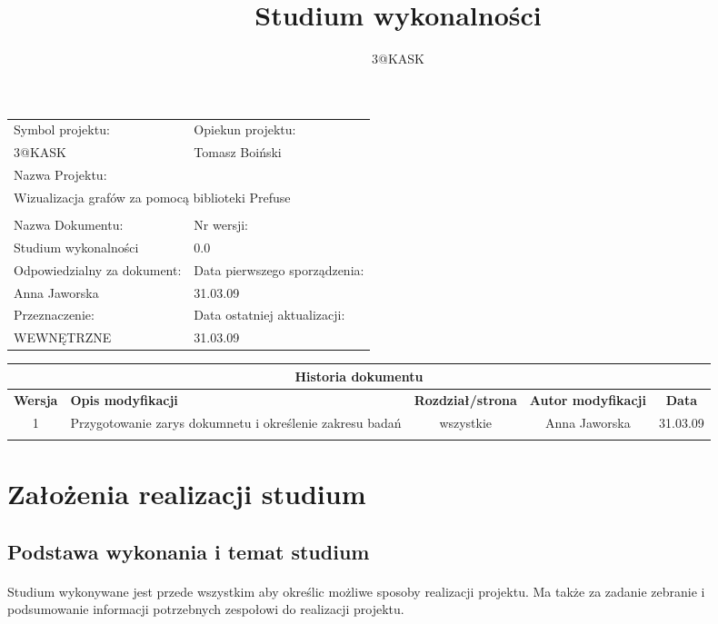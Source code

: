 \documentclass[a4paper,10pt]{article}
\title{Studium wykonalności}
\author{3@KASK}
\begin{document}



\maketitle


\begin{center}
\begin{tabular}{|p{7cm}|p{7cm}|}
\hline
Symbol projektu: & Opiekun projektu:   \tabularnewline 
3@KASK & Tomasz Boiński    \tabularnewline \hline
\multicolumn{2}{|l|}{Nazwa Projektu: } \tabularnewline
\multicolumn{2}{|l|}{Wizualizacja grafów za pomocą biblioteki Prefuse } \tabularnewline 
\hline
\multicolumn{2}{l}{ } \tabularnewline %
\hline 
Nazwa Dokumentu: & Nr wersji:   \tabularnewline 
Studium wykonalności & 0.0 \tabularnewline \hline
Odpowiedzialny za dokument: & Data pierwszego sporządzenia:   \tabularnewline 
Anna Jaworska & 31.03.09 \tabularnewline \hline
Przeznaczenie: & Data ostatniej aktualizacji:   \tabularnewline 
WEWNĘTRZNE & 31.03.09 \tabularnewline \hline
\end{tabular}
\end{center}

\begin{center}
\begin{tabular}{|c|p{4cm}|c|c|c|}
\multicolumn{5}{c}{\textbf{Historia dokumentu}} \tabularnewline \hline
\textbf{Wersja} & \textbf{Opis modyfikacji} & \textbf{Rozdział/strona} & \textbf{Autor modyfikacji} & \textbf{Data} \tabularnewline \hline 
1 & Przygotowanie zarys dokumnetu i określenie zakresu badań & wszystkie & Anna Jaworska & 31.03.09 \tabularnewline \hline
& & & &\tabularnewline \hline
\end{tabular}
 

\end{center}


\newpage
\tableofcontents
\newpage

\section{Założenia realizacji studium}

\subsection{Podstawa wykonania i temat studium}
\paragraph{} Studium wykonywane jest przede wszystkim aby określic możliwe sposoby realizacji projektu. Ma także za zadanie zebranie i podsumowanie informacji potrzebnych zespołowi do realizacji projektu. 
\end{document}

